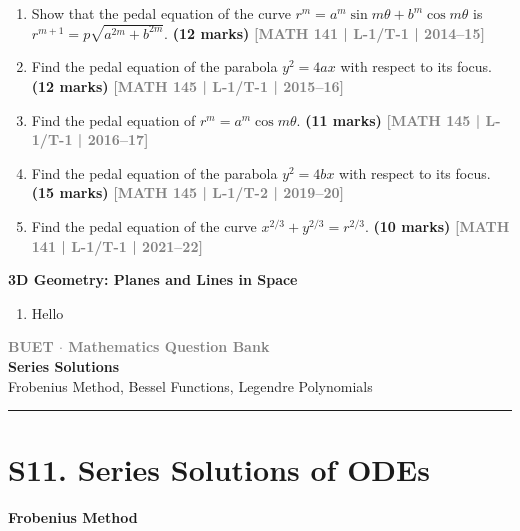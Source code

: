 \documentclass[12pt,a4paper]{article}
\newcommand{\yr}[1]{\hfill\textcolor{gray}{\small\textbf{[#1]}}}
\newcommand{\mk}[1]{\textcolor{orange!70!black}{\small\textbf{(#1 marks)}}}
\newcommand{\subtopic}[2]{%
  \vspace{10pt}
  \noindent\begin{tcolorbox}[colback=#1!8,colframe=#1,boxrule=0.6pt,arc=4pt,
    left=6pt,right=6pt,top=4pt,bottom=4pt]
    \small\bfseries\textcolor{#1}{#2}
  \end{tcolorbox}
  \vspace{2pt}
}
\newcommand{\secdivider}[3]{%
  \newpage\thispagestyle{empty}%
  \vspace*{\fill}%
  \begin{tcolorbox}[enhanced,colback=#3!6,colframe=#3,boxrule=1.5pt,arc=8pt,
    left=20pt,right=20pt,top=22pt,bottom=22pt,
    shadow={3pt}{-3pt}{0pt}{black!15}]
    \centering
    {\large\textcolor{gray}{\textbf{BUET $\cdot$ Mathematics Question Bank}}}\\[8pt]
    {\fontsize{26}{32}\selectfont\bfseries\textcolor{#3}{#1}}\\[6pt]
    {\fontsize{15}{19}\selectfont\textcolor{dgray}{#2}}\\[12pt]
    \textcolor{#3!60}{\rule{0.5\textwidth}{0.5pt}}
  \end{tcolorbox}%
  \vspace*{\fill}\newpage%
}
\begin{document}
\begin{enumerate}
\item Show that the pedal equation of the curve $r^{m}=a^{m}\sin m\theta+b^{m}\cos m\theta$ is $r^{m+1}=p\sqrt{a^{2m}+b^{2m}}$.
\mk{12} \yr{MATH 141 | L-1/T-1 | 2014--15}

\item Find the pedal equation of the parabola $y^{2}=4ax$ with respect to its focus.
\mk{12} \yr{MATH 145 | L-1/T-1 | 2015--16}

\item Find the pedal equation of $r^{m}=a^{m}\cos m\theta$.
\mk{11} \yr{MATH 145 | L-1/T-1 | 2016--17}

\item Find the pedal equation of the parabola $y^{2}=4bx$ with respect to its focus.
\mk{15} \yr{MATH 145 | L-1/T-2 | 2019--20}

\item Find the pedal equation of the curve $x^{2/3}+y^{2/3}=r^{2/3}$.
\mk{10} \yr{MATH 141 | L-1/T-1 | 2021--22}


\end{enumerate}

\subtopic{cH}{3D Geometry: Planes and Lines in Space}
\label{sub:s10-3d}

\begin{enumerate}
\item Hello \end{enumerate}


\secdivider{Series Solutions}{Frobenius Method, Bessel Functions, Legendre Polynomials}{cI}

\section{S11. Series Solutions of ODEs}
\label{sec:S11}

\subtopic{cI}{Frobenius Method}
\label{sub:s11-frobenius}
\end{document}
